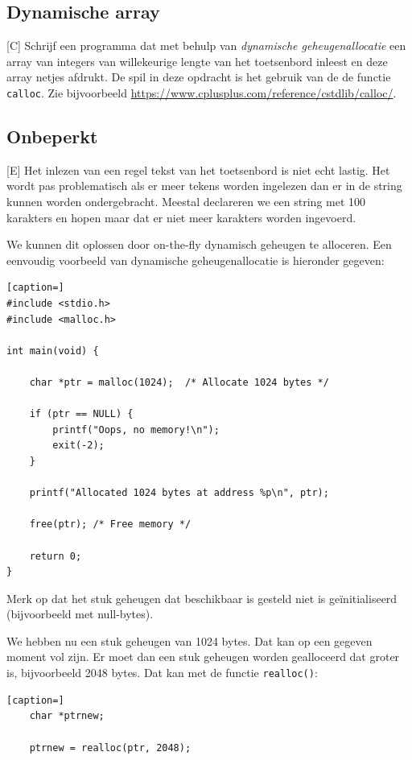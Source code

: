 \documentclass[a4paper,10pt,fleqn,twoside]{article}
\begin{document}
\subsection{Dynamische array}[C]
Schrijf een programma dat met behulp van \textsl{dynamische geheugenallocatie} een array van integers van willekeurige lengte van het toetsenbord inleest en deze array netjes afdrukt. De spil in deze opdracht is het gebruik van de de functie \lstinline|calloc|. Zie bijvoorbeeld \url{https://www.cplusplus.com/reference/cstdlib/calloc/}.

\subsection{Onbeperkt}[E]
Het inlezen van een regel tekst van het toetsenbord is niet echt lastig. Het wordt pas problematisch als er meer tekens worden ingelezen dan er in de string kunnen worden ondergebracht. Meestal declareren we een string met 100 karakters en hopen maar dat er niet meer karakters worden ingevoerd.

We kunnen dit oplossen door on-the-fly dynamisch geheugen te alloceren. Een eenvoudig voorbeeld van dynamische geheugenallocatie is hieronder gegeven:

\begin{lstlisting}[caption=]
#include <stdio.h>
#include <malloc.h>

int main(void) {

	char *ptr = malloc(1024);  /* Allocate 1024 bytes */

	if (ptr == NULL) {
		printf("Oops, no memory!\n");
		exit(-2);
	}

	printf("Allocated 1024 bytes at address %p\n", ptr);

	free(ptr); /* Free memory */

	return 0;
}
\end{lstlisting}

Merk op dat het stuk geheugen dat beschikbaar is gesteld niet is geïnitialiseerd (bijvoorbeeld met null-bytes).

We hebben nu een stuk geheugen van 1024 bytes. Dat kan op een gegeven moment vol zijn. Er moet dan een stuk geheugen worden gealloceerd dat groter is, bijvoorbeeld 2048 bytes. Dat kan met de functie \lstinline|realloc()|:

\begin{lstlisting}[caption=]
	char *ptrnew;

	ptrnew = realloc(ptr, 2048);
\end{lstlisting}
\end{document}
